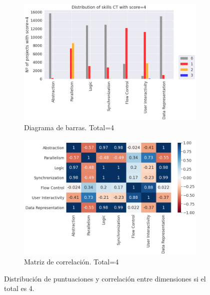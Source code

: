 \documentclass[a4paper, 12pt]{book}
\begin{document}
\begin{figure}[H]
    \centering
    \begin{subfigure}[h]{.49\textwidth} 
        \includegraphics[width=\textwidth]{img/distribucion_4_Scratch}
        \caption{Diagrama de barras. Total=4}
        \label{fig:total4}
    \end{subfigure}       
    \begin{subfigure}[h]{.49\textwidth} 
        \includegraphics[width=\textwidth]{img/corr_4_Scratch}
        \caption{Matriz de correlación. Total=4}
        \label{fig:corr4}
    \end{subfigure}
     \caption{Distribución de puntuaciones y correlación entre dimensiones si el total es 4.}
\end{figure}
\end{document}
